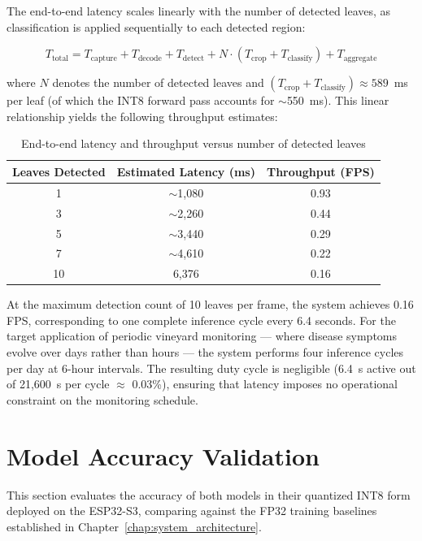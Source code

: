 The end-to-end latency scales linearly with the number of detected leaves, as classification is applied sequentially to each detected region:

\begin{equation}
T_{\text{total}} = T_{\text{capture}} + T_{\text{decode}} + T_{\text{detect}} + N \cdot (T_{\text{crop}} + T_{\text{classify}}) + T_{\text{aggregate}}
\end{equation}

where $N$ denotes the number of detected leaves and $(T_{\text{crop}} + T_{\text{classify}}) \approx 589$~ms per leaf (of which the INT8 forward pass accounts for $\sim$550~ms). This linear relationship yields the following throughput estimates:

\begin{table}[htbp]
\centering
\caption{End-to-end latency and throughput versus number of detected leaves}
\label{tab:latency_vs_leaves}
\begin{tabular}{ccc}
\toprule
\textbf{Leaves Detected} & \textbf{Estimated Latency (ms)} & \textbf{Throughput (FPS)} \\
\midrule
1   & $\sim$1,080   & 0.93  \\
3   & $\sim$2,260   & 0.44  \\
5   & $\sim$3,440   & 0.29  \\
7   & $\sim$4,610   & 0.22  \\
10  & 6,376         & 0.16  \\
\bottomrule
\end{tabular}
\end{table}

At the maximum detection count of 10 leaves per frame, the system achieves 0.16 FPS, corresponding to one complete inference cycle every 6.4 seconds. For the target application of periodic vineyard monitoring --- where disease symptoms evolve over days rather than hours --- the system performs four inference cycles per day at 6-hour intervals. The resulting duty cycle is negligible (6.4~s active out of 21,600~s per cycle $\approx$ 0.03\%), ensuring that latency imposes no operational constraint on the monitoring schedule.


\section{Model Accuracy Validation}
\label{sec:accuracy_validation}

This section evaluates the accuracy of both models in their quantized INT8 form deployed on the ESP32-S3, comparing against the FP32 training baselines established in Chapter~\ref{chap:system_architecture}.

